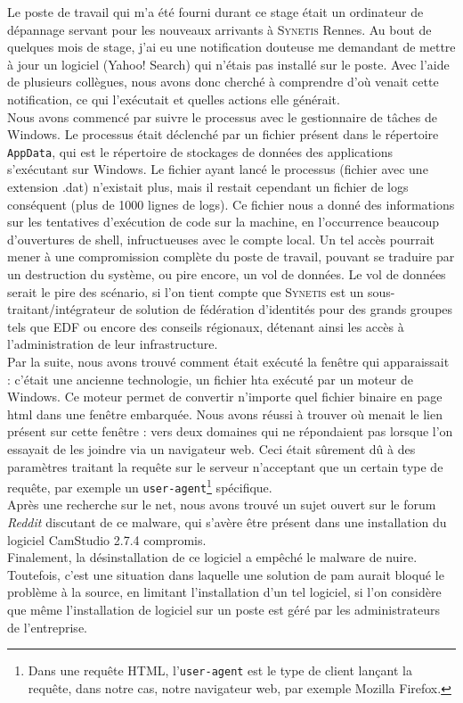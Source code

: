 Le poste de travail qui m'a été fourni durant ce stage était un ordinateur de dépannage servant pour les nouveaux arrivants à \textsc{Synetis} Rennes. Au bout de quelques mois de stage, j'ai eu une notification douteuse me demandant de mettre à jour un logiciel (Yahoo! Search) qui n'étais pas installé sur le poste. Avec l'aide de plusieurs collègues, nous avons donc cherché à comprendre d'où venait cette notification, ce qui l'exécutait et quelles actions elle générait.\\
Nous avons commencé par suivre le processus avec le gestionnaire de tâches de Windows. Le processus était déclenché par un fichier présent dans le répertoire \texttt{AppData}, qui est le répertoire de stockages de données des applications s'exécutant sur Windows. Le fichier ayant lancé le processus (fichier avec une extension .dat) n'existait plus, mais il restait cependant un fichier de logs conséquent (plus de 1000 lignes de logs). Ce fichier nous a donné des informations sur les tentatives d'exécution de code sur la machine, en l'occurrence beaucoup d'ouvertures de shell, infructueuses avec le compte local. Un tel accès pourrait mener à une compromission complète du poste de travail, pouvant se traduire par un destruction du système, ou pire encore, un vol de données. Le vol de données serait le pire des scénario, si l'on tient compte que \textsc{Synetis} est un sous-traitant/intégrateur de solution de fédération d'identités pour des grands groupes tels que EDF ou encore des conseils régionaux, détenant ainsi les accès à l'administration de leur infrastructure.\\
Par la suite, nous avons trouvé comment était exécuté la fenêtre qui apparaissait : c'était une ancienne technologie, un fichier hta exécuté par un moteur de Windows. Ce moteur permet de convertir n'importe quel fichier binaire en page html dans une fenêtre embarquée. Nous avons réussi à trouver où menait le lien présent sur cette fenêtre : vers deux domaines qui ne répondaient pas lorsque l'on essayait de les joindre via un navigateur web. Ceci était sûrement dû à des paramètres traitant la requête sur le serveur n'acceptant que un certain type de requête, par exemple un \texttt{user-agent}\footnote{Dans une requête HTML, l'\texttt{user-agent} est le type de client lançant la requête, dans notre cas, notre navigateur web, par exemple Mozilla Firefox.} spécifique.\\
Après une recherche sur le net, nous avons trouvé un sujet ouvert sur le forum \emph{Reddit} discutant de ce malware, qui s'avère être présent dans une installation du logiciel CamStudio 2.7.4 compromis.\\
Finalement, la désinstallation de ce logiciel a empêché le malware de nuire. Toutefois, c'est une situation dans laquelle une solution de \gls{pam} aurait bloqué le problème à la source, en limitant l'installation d'un tel logiciel, si l'on considère que même l'installation de logiciel sur un poste est géré par les administrateurs de l'entreprise.

